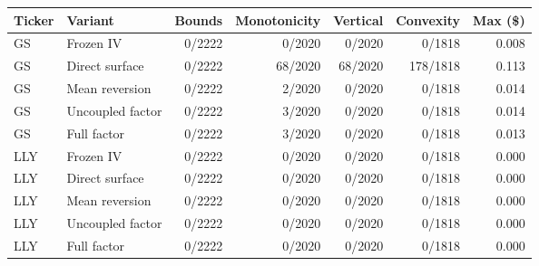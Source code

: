 \begin{tabular}{llrrrrr}
\toprule
Ticker & Variant & Bounds & Monotonicity & Vertical & Convexity & Max (\$) \\
\midrule
GS & Frozen IV & 0/2222 & 0/2020 & 0/2020 & 0/1818 & 0.008 \\
GS & Direct surface & 0/2222 & 68/2020 & 68/2020 & 178/1818 & 0.113 \\
GS & Mean reversion & 0/2222 & 2/2020 & 0/2020 & 0/1818 & 0.014 \\
GS & Uncoupled factor & 0/2222 & 3/2020 & 0/2020 & 0/1818 & 0.014 \\
GS & Full factor & 0/2222 & 3/2020 & 0/2020 & 0/1818 & 0.013 \\
LLY & Frozen IV & 0/2222 & 0/2020 & 0/2020 & 0/1818 & 0.000 \\
LLY & Direct surface & 0/2222 & 0/2020 & 0/2020 & 0/1818 & 0.000 \\
LLY & Mean reversion & 0/2222 & 0/2020 & 0/2020 & 0/1818 & 0.000 \\
LLY & Uncoupled factor & 0/2222 & 0/2020 & 0/2020 & 0/1818 & 0.000 \\
LLY & Full factor & 0/2222 & 0/2020 & 0/2020 & 0/1818 & 0.000 \\
\bottomrule
\end{tabular}
